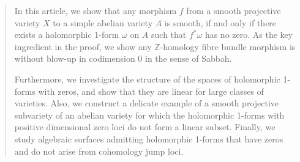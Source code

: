 \documentclass[a4paper,12pt,reqno]{amsart}
\theoremstyle{question}
\theoremstyle{definition}
\theoremstyle{remark}
\theoremstyle{cited}
\theoremstyle{citeddef}
\begin{document}
\begin{abstract}



In this article, we show  that any  morphism $f$ from a smooth projective variety $X$ to a simple abelian variety $A$ is smooth, if and only if there exists a holomorphic 1-form $\omega$ on $A$  such that $f^*\omega$ has no zero. As the key ingredient in the proof, we show any $\mathbb{Z}$-homology fibre bundle morphism is without blow-up in codimension 0 in the sense of Sabbah.

Furthermore, we investigate the structure of the spaces of holomorphic 1-forms with zeros, and show that they are linear for large classes of varieties. Also, we construct a delicate example of a smooth projective subvariety of an abelian variety for which the holomorphic 1-forms with positive dimensional zero loci do not form a linear subset. Finally, we study algebraic surfaces admitting holomorphic 1-forms that have zeros and do not arise from cohomology jump loci.

\end{abstract}
\maketitle
\vspace*{6pt}
\tableofcontents  %
\end{document}
